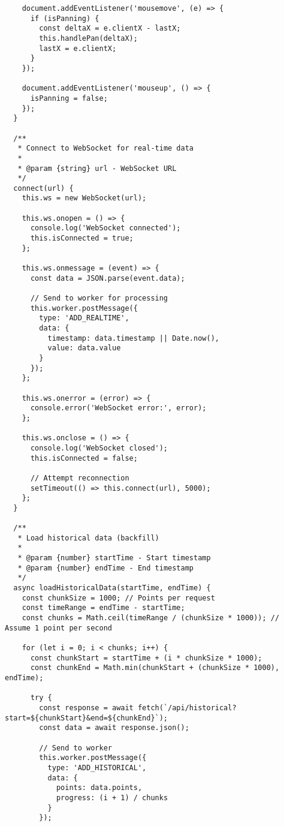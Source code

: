 \documentclass[11pt]{article}
\begin{document}
\begin{verbatim}
    document.addEventListener('mousemove', (e) => {
      if (isPanning) {
        const deltaX = e.clientX - lastX;
        this.handlePan(deltaX);
        lastX = e.clientX;
      }
    });
    
    document.addEventListener('mouseup', () => {
      isPanning = false;
    });
  }
  
  /**
   * Connect to WebSocket for real-time data
   * 
   * @param {string} url - WebSocket URL
   */
  connect(url) {
    this.ws = new WebSocket(url);
    
    this.ws.onopen = () => {
      console.log('WebSocket connected');
      this.isConnected = true;
    };
    
    this.ws.onmessage = (event) => {
      const data = JSON.parse(event.data);
      
      // Send to worker for processing
      this.worker.postMessage({
        type: 'ADD_REALTIME',
        data: {
          timestamp: data.timestamp || Date.now(),
          value: data.value
        }
      });
    };
    
    this.ws.onerror = (error) => {
      console.error('WebSocket error:', error);
    };
    
    this.ws.onclose = () => {
      console.log('WebSocket closed');
      this.isConnected = false;
      
      // Attempt reconnection
      setTimeout(() => this.connect(url), 5000);
    };
  }
  
  /**
   * Load historical data (backfill)
   * 
   * @param {number} startTime - Start timestamp
   * @param {number} endTime - End timestamp
   */
  async loadHistoricalData(startTime, endTime) {
    const chunkSize = 1000; // Points per request
    const timeRange = endTime - startTime;
    const chunks = Math.ceil(timeRange / (chunkSize * 1000)); // Assume 1 point per second
    
    for (let i = 0; i < chunks; i++) {
      const chunkStart = startTime + (i * chunkSize * 1000);
      const chunkEnd = Math.min(chunkStart + (chunkSize * 1000), endTime);
      
      try {
        const response = await fetch(`/api/historical?start=${chunkStart}&end=${chunkEnd}`);
        const data = await response.json();
        
        // Send to worker
        this.worker.postMessage({
          type: 'ADD_HISTORICAL',
          data: {
            points: data.points,
            progress: (i + 1) / chunks
          }
        });
        

\end{verbatim}
\end{document}
